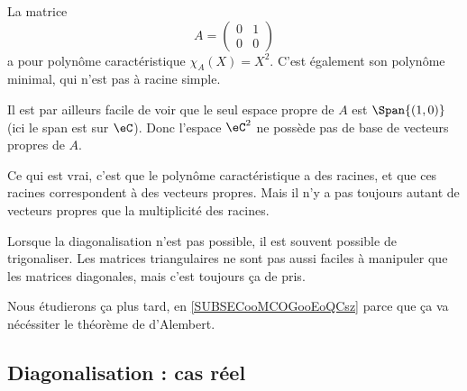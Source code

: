 \begin{example}
	La matrice
	\begin{equation}
		A=\begin{pmatrix}
			0 & 1 \\
			0 & 0
		\end{pmatrix}
	\end{equation}
	a pour polynôme caractéristique \( \chi_A(X)=X^2\). C'est également son polynôme minimal, qui n'est pas à racine simple.

	Il est par ailleurs facile de voir que le seul espace propre de \( A\) est \( \Span\{ (1,0) \}\) (ici le span est sur \( \eC\)). Donc l'espace \( \eC^2\) ne possède pas de base de vecteurs propres de \( A\).
\end{example}

Ce qui est vrai, c'est que le polynôme caractéristique a des racines, et que ces racines correspondent à des vecteurs propres. Mais il n'y a pas toujours autant de vecteurs propres que la multiplicité des racines.

\begin{normaltext}
	Lorsque la diagonalisation n'est pas possible, il est souvent possible de trigonaliser. Les matrices triangulaires ne sont pas aussi faciles à manipuler que les matrices diagonales, mais c'est toujours ça de pris.

	Nous étudierons ça plus tard, en \ref{SUBSECooMCOGooEoQCsz} parce que ça va nécéssiter le théorème de d'Alembert.
\end{normaltext}

\subsection{Diagonalisation : cas réel}

